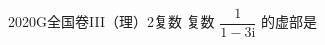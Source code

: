 
\begin{problem}{2020}{G}{全国卷III（理）}{2}{复数}
复数 $ \dfrac{1}{1 - 3\mathrm{i}} $ 的虚部是
\begin{choices}
\end{choices}
\end{problem}

\begin{answer}

\end{answer}

\begin{solutions}

\end{solutions}